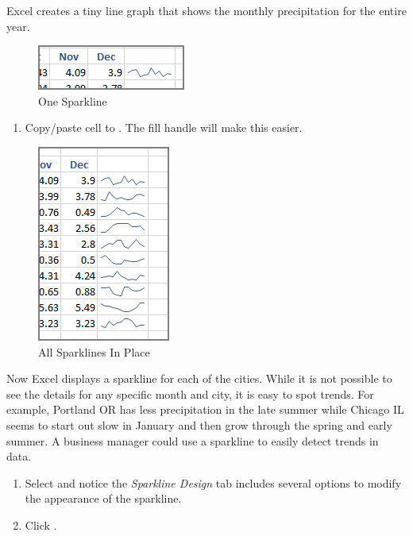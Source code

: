 Excel creates a tiny line graph that shows the monthly precipitation for the entire year. 

\begin{figure}[H]
	\centering
	\includegraphics[width=\maxwidth{.50\linewidth}]{gfx/ch08_fig03}
	\caption{One Sparkline}
	\label{08:fig03}
\end{figure}

\begin{enumbox}
	\begin{enumerate}
		\item Copy/paste cell  to . The fill handle will make this easier. 
	\end{enumerate}
\end{enumbox}

\begin{figure}[H]
	\centering
	\includegraphics[width=\maxwidth{.50\linewidth}]{gfx/ch08_fig04}
	\caption{All Sparklines In Place}
	\label{08:fig04}
\end{figure}

Now Excel displays a sparkline for each of the cities. While it is not possible to see the details for any specific month and city, it is easy to spot trends. For example, Portland OR has less precipitation in the late summer while Chicago IL seems to start out slow in January and then grow through the spring and early summer. A business manager could use a sparkline to easily detect trends in data.

\begin{enumbox}
	\begin{enumerate}
		\item Select  and notice the \textit{Sparkline Design} tab includes several options to modify the appearance of the sparkline. 
		\item Click .
	\end{enumerate}
\end{enumbox}
	
